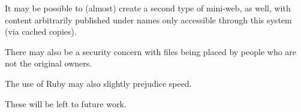 It may be possible to (almost) create a second type of mini-web, as well, with content arbitrarily published under names only accessible through this system (via cached copies).  

There may also be a security concern with files being placed by people who are not the original owners.

The use of Ruby may also slightly prejudice speed.

These will be left to future work.


